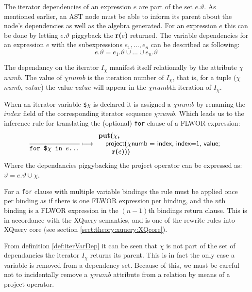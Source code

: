 The iterator dependencies of an expression $e$ are part of the set $e.\vartheta$. As mentioned earlier,
an AST node must be able to inform its parent about the node's dependencies as well as the algebra generated. For
an expression $e$ this can be done by letting $e.\vartheta$ piggyback the \textbf{r(}$e$\textbf{)} returned. The
variable dependencies for an expression $e$ with the subexpressions $e_{1},\ldots,e_{n}$ can be described as
following:
\begin{equation}
e.\vartheta = e_{1}.\vartheta\cup\ldots\cup e_{n}.\vartheta
\label{eq:trans:TD:depInheritance}
\end{equation}

The dependancy on the iterator $I_{\chi}$ manifest itself relationally by the attribute $\chi$$numb$. The value of
$\chi$$numb$ is the iteration number of $I_{\chi}$, that is, for a tuple ($\chi$$numb$, $value$) the value $value$
will appear in the $\chi$$numb$th iteration of $I_{\chi}$.

When an iterator variable \texttt{\$}$\chi$ is declared it is assigned a $\chi$$numb$ by renaming the $index$
field of the corresponding iterator sequence $\chi$$numb$. Which leads us to the inference rule for translating the
(optional) \texttt{for} clause of a FLWOR expression:
\begin{equation}
\frac{}{\mbox{\texttt{for \$}}\chi \mbox{\texttt{ in }} e \mbox{\texttt{\ldots}}}\longmapsto
\begin{array}{l}
\mbox{\textbf{put(}}\chi\mbox{\textbf{, }} \\ \quad
\mbox{\textsf{project(}}\chi\mbox{\textsf{numb = index, index=1, value;}} \\ \quad \quad
\mbox{\textbf{r(}}e\mbox{\textbf{)}\textsf{)}\textbf{)}}
\end{array}
\label{rule:trans:TD:forbind}
\end{equation}
Where the dependancies piggybacking the \textsf{project} operator can be expressed as:
$\vartheta = e.\vartheta \cup \chi$.

For a \texttt{for} clause with multiple variable bindings the rule must be applied once per binding as if there
is one FLWOR expression per binding, and the $n$th binding is a FLWOR expression in the $(n-1)$th bindings
return clause. This is in accordance with the XQuery semantics, and is one of the rewrite rules into XQuery core
(see section \ref{sect:theory:xquery:XQcore}).

From definition \ref{def:iterVarDep} it can be seen that $\chi$ is not part of the set of dependancies the iterator
$I_{\chi}$ returns its parent. This is in fact the only case a variable is removed from a dependency set. Because
of this, we must be careful not to incidentally remove a $\chi$$numb$ attribute from a relation by means of a
\textsf{project} operator. 

